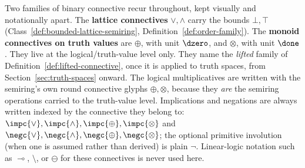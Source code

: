 
Two families of binary connective recur throughout, kept visually and
notationally apart. The \textbf{lattice connectives} $\vee,\wedge$
carry the bounds $\bot,\top$
(Class~\ref{def:bounded-lattice-semiring},
Definition~\ref{def:order-family}). The \textbf{monoid connectives on truth values} are $\oplus$, with unit
$\dzero$, and $\otimes$, with unit $\done$. They live at the
logical/truth-value level only. They name the \emph{lifted} family of
Definition~\ref{def:lifted-connective}, once it is applied to truth
spaces, from Section~\ref{sec:truth-spaces} onward. The logical
multiplicatives are written with the semiring's own round connective
glyphs $\oplus,\otimes$, because they \emph{are} the semiring
operations carried to the truth-value level. Implications and
negations are always written indexed by the connective they belong to:
$\impc{\vee},\impc{\wedge},\impc{\oplus},\impc{\otimes}$ and
$\negc{\vee},\negc{\wedge},\negc{\oplus},\negc{\otimes}$; the optional
primitive involution (when one is assumed rather than derived) is
plain $\neg$. Linear-logic notation such as $\multimap$, $\setminus$,
or $\ominus$ for these connectives is never used here.

